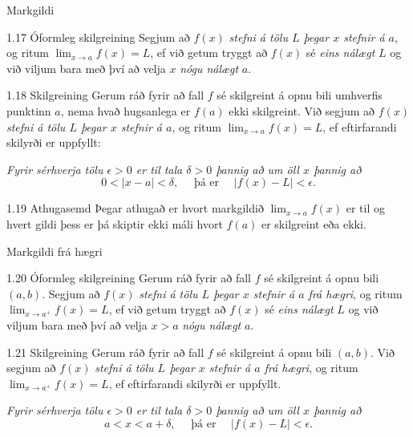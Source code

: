 \documentclass[icelandic,a4paper,12pt]{article}
\begin{document}
\begin{frame}{Markgildi}
\begin{block}{1.17 Óformleg skilgreining}  
Segjum að  $f(x)$
{\it stefni á tölu $L$ þegar $x$ stefnir á $a$}, og ritum
$\lim_{x\rightarrow a} f(x)=L$, ef við getum tryggt að  $f(x)$ sé {\em
  eins nálægt}
$L$ og við viljum bara með því að velja $x$ {\em nógu nálægt} $a$.  
\end{block}

\pause

\begin{block}{1.18 Skilgreining} Gerum ráð fyrir að fall $f$ sé
skilgreint á opnu bili umhverfis punktinn $a$, nema hvað hugsanlega er
$f(a)$ ekki skilgreint. \pause 
Við segjum að $f(x)$
{\it stefni á tölu $L$ þegar $x$ stefnir á $a$}, og ritum
$\lim_{x\rightarrow a} f(x)=L$, ef eftirfarandi skilyrði er uppfyllt:

{\it Fyrir sérhverja tölu $\epsilon>0$ er til tala $\delta>0$ þannig
  að um öll $x$ þannig að}
$$
0<|x-a|<\delta,\quad \text{ þá er } \quad |f(x)-L|<\epsilon.
$$
\end{block}

\pause

\begin{block}{1.19 Athugasemd}  Þegar athugað er hvort markgildið
$\lim_{x\rightarrow a} f(x)$ er til og hvert gildi þess er þá skiptir
ekki máli hvort $f(a)$ er skilgreint eða ekki.
\end{block}
\end{frame}

\begin{frame}{Markgildi frá hægri}
\begin{block}{1.20 Óformleg skilgreining}   
Gerum ráð fyrir að fall $f$ sé
skilgreint á opnu bili $(a,b)$.  Segjum að  $f(x)$
{\it stefni á tölu $L$ þegar $x$ stefnir á $a$ frá hægri}, og ritum
$\lim_{x\rightarrow a^+} f(x)=L$, ef við getum tryggt að  $f(x)$ sé 
{\em eins nálægt}
$L$ og við viljum bara með því að velja $x>a$ {\em nógu nálægt} $a$. 
\end{block}

\pause

\begin{block}{1.21 Skilgreining} Gerum ráð fyrir að fall $f$ sé
skilgreint á opnu bili $(a,b)$.  Við segjum að $f(x)$
{\it stefni á tölu $L$ þegar $x$ stefnir á $a$ frá hægri}, og ritum
$\lim_{x\rightarrow a^+} f(x)=L$, ef eftirfarandi skilyrði er uppfyllt.

{\it Fyrir sérhverja tölu $\epsilon>0$ er til tala $\delta>0$ þannig
  að um öll $x$ þannig að} 
$$
a<x<a+\delta,\quad \text{ þá er } \quad |f(x)-L|<\epsilon.
$$
\end{block}
\end{frame}
\end{document}
